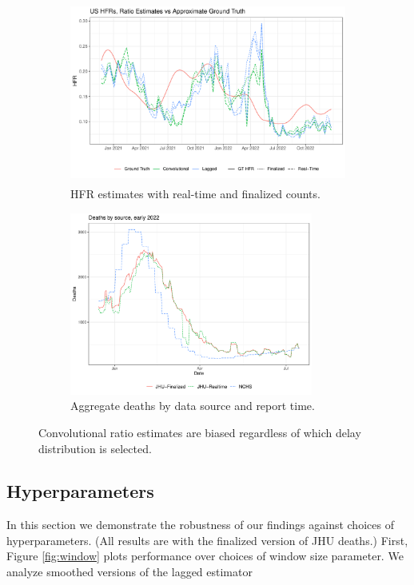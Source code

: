 \documentclass{article}
\begin{document}
\begin{figure}
     \centering
     \begin{subfigure}[b]{0.45\linewidth}
         \centering
         \includegraphics[height=6cm]{Figs/Real/US_ests_realtime_both.pdf}
         \caption{HFR estimates with real-time and finalized counts.}
         \label{fig:rt_and_final}
     \end{subfigure}
     \hfill
     \begin{subfigure}[b]{0.45\linewidth}
         \centering
         \includegraphics[height=6cm]{Figs/Real/death_curves.pdf}
         \caption{Aggregate deaths by data source and report time.}
         \label{fig:source}
     \end{subfigure}
        \caption{Convolutional ratio estimates are biased regardless of which delay distribution is selected.}
        \label{fig:real_time_vs_finalized}
\end{figure}


\subsection{Hyperparameters}
In this section we demonstrate the robustness of our findings against choices of hyperparameters. (All results are with the finalized version of JHU deaths.) First, Figure \ref{fig:window} plots performance over choices of window size parameter. We analyze smoothed versions of the lagged estimator
\end{document}
